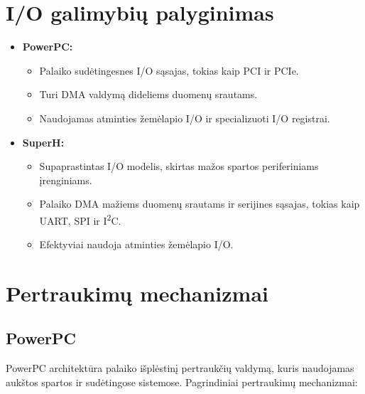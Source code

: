 \documentclass{article}
\begin{document}
\section*{I/O galimybių palyginimas}
\begin{itemize}
    \item \textbf{PowerPC:}
        \begin{itemize}
            \item Palaiko sudėtingesnes I/O sąsajas, tokias kaip PCI ir PCIe.
            \item Turi DMA valdymą dideliems duomenų srautams.
            \item Naudojamas atminties žemėlapio I/O ir specializuoti I/O registrai.
        \end{itemize}
    \item \textbf{SuperH:}
        \begin{itemize}
            \item Supaprastintas I/O modelis, skirtas mažos spartos periferiniams įrenginiams.
            \item Palaiko DMA mažiems duomenų srautams ir serijines sąsajas, tokias kaip UART, SPI ir I\textsuperscript{2}C.
            \item Efektyviai naudoja atminties žemėlapio I/O.
        \end{itemize}
\end{itemize}

\section{Pertraukimų mechanizmai}
\subsection{PowerPC}
PowerPC architektūra palaiko išplėstinį pertraukčių valdymą, kuris naudojamas aukštos spartos ir sudėtingose sistemose. Pagrindiniai pertraukimų mechanizmai:
\end{document}
